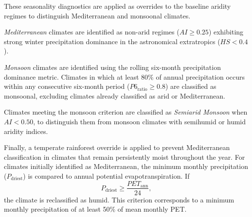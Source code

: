 \documentclass[12pt]{article}
\begin{document}
These seasonality diagnostics are applied as overrides to the baseline
aridity regimes to distinguish Mediterranean and monsoonal climates.

\emph{Mediterranean} climates are identified as non-arid regimes
($AI \ge 0.25$) exhibiting strong winter precipitation dominance in the
astronomical extratropics ($HS < 0.4$).

\emph{Monsoon} climates are identified using the rolling six-month precipitation
dominance metric. Climates in which at least 80\% of annual precipitation
occurs within any consecutive six-month period
($P6_{\text{ratio}} \ge 0.8$) are classified as monsoonal, excluding climates
already classified as arid or Mediterranean.

Climates meeting the monsoon criterion are classified as \emph{Semiarid Monsoon} when $AI < 0.50$, to distinguish them from monsoon climates with semihumid or humid aridity indices.

Finally, a temperate rainforest override is applied to prevent
Mediterranean classification in climates that remain persistently moist
throughout the year. For climates initially identified as Mediterranean,
the minimum monthly precipitation ($P_{\text{driest}}$) is compared to
annual potential evapotranspiration. If
\[
P_{\text{driest}} \ge \frac{PET_{\text{ann}}}{24},
\]
the climate is reclassified as humid. This criterion corresponds to a
minimum monthly precipitation of at least 50\% of mean monthly PET.
\end{document}
